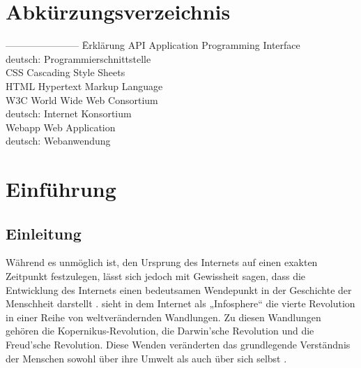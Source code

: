 \documentclass[a4paper]{scrartcl}
\begin{document}
\newpage

\section*{Abkürzungsverzeichnis}


\begin{tabbing}
	----------------------- \= Erklärung \kill
	API \> Application Programming Interface \\
	\> deutsch: Programmierschnittstelle \\
	CSS \> Cascading Style Sheets \\
	HTML \> Hypertext Markup Language \\
	W3C \> World Wide Web Consortium \\
	\> deutsch: Internet Konsortium \\
	Webapp \> Web Application \\
	\> deutsch: Webanwendung
	
\end{tabbing}


\newpage

\listoffigures


\newpage

\listoftables


\newpage

\setcounter{page}{1}


\section{Einführung}

\subsection{Einleitung}
Während es unmöglich ist, den Ursprung des Internets auf einen exakten Zeitpunkt festzulegen, lässt sich jedoch mit Gewissheit sagen, dass die Entwicklung des Internets einen bedeutsamen Wendepunkt in der Geschichte der Menschheit darstellt \autocite[26]{Kleinrock}. \textcite{Floridi} sieht in dem Internet als „Infosphere“ \autocite[9]{Floridi} die vierte Revolution in einer Reihe von weltverändernden Wandlungen. Zu diesen Wandlungen gehören die Kopernikus-Revolution, die Darwin'sche Revolution und die Freud'sche Revolution. Diese Wenden veränderten das grundlegende Verständnis der Menschen sowohl über ihre Umwelt als auch über sich selbst \autocite[8f.]{Floridi}. \\
\end{document}
